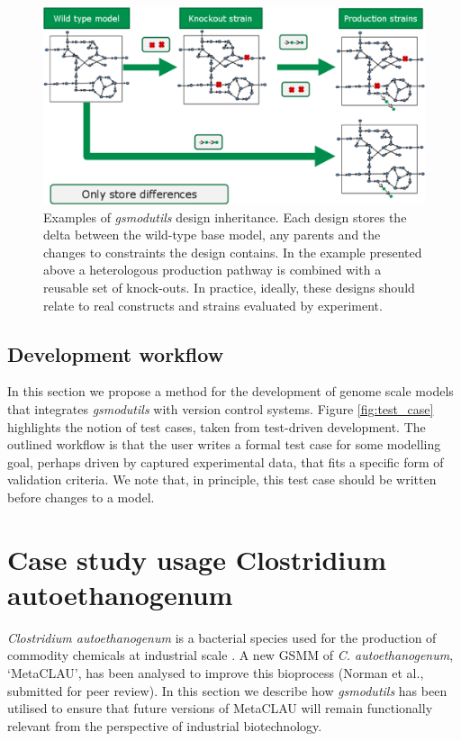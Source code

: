 \documentclass[journal=asbcd6,10pt]{achemso}
\begin{document}
\begin{figure}
  \includegraphics[width=\textwidth]{inheritence2.eps}
  \caption{Examples of \textit{gsmodutils} design inheritance.
  Each design stores the delta between the wild-type base model, any parents and the changes to constraints the design contains.
  In the example presented above a heterologous production pathway is combined with a reusable set of knock-outs.
  In practice, ideally, these designs should relate to real constructs and strains evaluated by experiment.
  }
    \label{fig:strain_hered}
\end{figure}

\subsection{Development workflow}
In this section we propose a method for the development of genome scale models that integrates \textit{gsmodutils} with version control systems.
Figure \ref{fig:test_case} highlights the notion of test cases, taken from test-driven development.
The outlined workflow is that the user writes a formal test case for some modelling goal, perhaps driven by captured experimental data, that fits a specific form of validation criteria.
We note that, in principle, this test case should be written before changes to a model.


\section{Case study usage Clostridium autoethanogenum}
\textit{Clostridium autoethanogenum} is a bacterial species used for the production of commodity chemicals at industrial scale \cite{abrini1994clostridium,norman2018progress,LT}. A new GSMM of \textit{C. autoethanogenum}, `MetaCLAU', has been analysed to improve this bioprocess (Norman et al., submitted for peer review).
In this section we describe how \textit{gsmodutils} has been utilised to ensure that future versions of MetaCLAU will remain functionally relevant from the perspective of industrial biotechnology.
\end{document}
